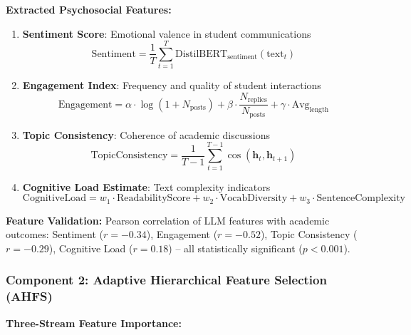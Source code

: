 \textbf{Extracted Psychosocial Features:}
\begin{enumerate}
\item \textbf{Sentiment Score}: Emotional valence in student communications
\begin{equation}
\text{Sentiment} = \frac{1}{T} \sum_{t=1}^{T} \text{DistilBERT}_{\text{sentiment}}(\text{text}_t)
\end{equation}

\item \textbf{Engagement Index}: Frequency and quality of student interactions
\begin{equation}
\text{Engagement} = \alpha \cdot \log(1 + N_{\text{posts}}) + \beta \cdot \frac{N_{\text{replies}}}{N_{\text{posts}}} + \gamma \cdot \text{Avg}_{\text{length}}
\end{equation}

\item \textbf{Topic Consistency}: Coherence of academic discussions
\begin{equation}
\text{TopicConsistency} = \frac{1}{T-1} \sum_{t=1}^{T-1} \cos(\mathbf{h}_t, \mathbf{h}_{t+1})
\end{equation}

\item \textbf{Cognitive Load Estimate}: Text complexity indicators
\begin{equation}
\text{CognitiveLoad} = w_1 \cdot \text{ReadabilityScore} + w_2 \cdot \text{VocabDiversity} + w_3 \cdot \text{SentenceComplexity}
\end{equation}
\end{enumerate}

\textbf{Feature Validation:}
Pearson correlation of LLM features with academic outcomes: Sentiment ($r=-0.34$), Engagement ($r=-0.52$), Topic Consistency ($r=-0.29$), Cognitive Load ($r=0.18$) -- all statistically significant ($p<0.001$).

\subsubsection{Component 2: Adaptive Hierarchical Feature Selection (AHFS)}

\textbf{Three-Stream Feature Importance:}

